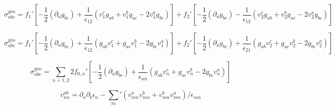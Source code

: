 \documentclass{article}
\begin{document}
\begin{equation}
\label{eq:D-125}
\sigma_{abc}^{\mathrm{geo}}=f_{1}'[-\frac{1}{2}(\partial_{a}g_{bc})+\frac{1}{\epsilon_{12}}(v_{1}^{c}g_{ab}+v_{1}^{b}g_{ac}-2v_{1}^{a}g_{bc})]+f_{2}'[-\frac{1}{2}(\partial_{a}g_{bc})-\frac{1}{\epsilon_{12}}(v_{2}^{c}g_{ab}+v_{2}^{b}g_{ac}-2v_{2}^{a}g_{bc})]
\end{equation}

\begin{equation}
\label{eq:D-126}
\sigma_{abc}^{\mathrm{geo}}=f_{1}'[-\frac{1}{2}(\partial_{a}g_{bc})+\frac{1}{\epsilon_{12}}(g_{ab}v_{1}^{c}+g_{ac}v_{1}^{b}-2g_{bc}v_{1}^{a})]+f_{2}'[-\frac{1}{2}(\partial_{a}g_{bc})+\frac{1}{\epsilon_{21}}(g_{ab}v_{2}^{c}+g_{ac}v_{2}^{b}-2g_{bc}v_{2}^{a})]
\end{equation}

\begin{equation}
\label{eq:D-127}
\sigma_{abc}^{\mathrm{geo}}=\sum_{n=1,2}2f_{0,n}'[-\frac{1}{2}(\partial_{a}g_{bc})+\frac{1}{\epsilon_{n\bar n}}(g_{ab}v_{n}^{c}+g_{ac}v_{n}^{b}-2g_{bc}v_{n}^{a})]
\end{equation}

\begin{equation}
\label{eq:E-128}
v_{nn}^{ab}=\partial_{a}\partial_{b}\epsilon_{n}-\sum_{m}'(v_{nm}^{a}v_{mn}^{b}+v_{nm}^{b}v_{mn}^{a})/\epsilon_{nm}
\end{equation}
\end{document}
